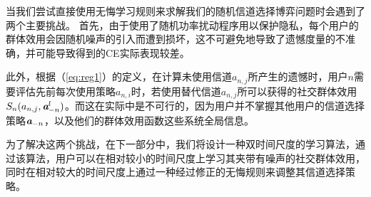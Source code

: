 当我们尝试直接使用无悔学习规则来求解我们的随机信道选择博弈问题时会遇到了两个主要挑战。
首先，由于使用了随机功率扰动程序用以保护隐私，每个用户的群体效用会因随机噪声的引入而遭到损坏，这不可避免地导致了遗憾度量的不准确，并可能导致得到的CE实际表现较差。

此外，根据（\ref{eq:reg1}）的定义，在计算未使用信道$a_{n,j}$所产生的遗憾时，用户$n$需要评估先前每次使用策略$a_{n,i}$时，若使用替代信道$a_{n,j}$所可以获得的社交群体效用$S_n(a_{n,j},\emph{\textbf{a}}^l_{-n})$。而这在实际中是不可行的，因为用户并不掌握其他用户的信道选择策略$\emph{\textbf{a}}_{-n}$，以及他们的群体效用函数这些系统全局信息。


为了解决这两个挑战，在下一部分中，我们将设计一种双时间尺度的学习算法，通过该算法，用户可以在相对较小的时间尺度上学习其夹带有噪声的社交群体效用，同时在相对较大的时间尺度上通过一种经过修正的无悔规则来调整其信道选择策略。

